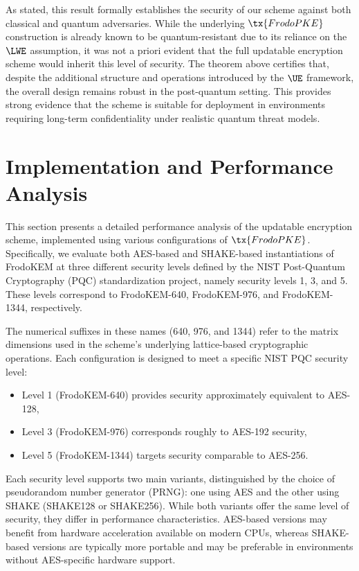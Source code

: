 \documentclass{fundam}
\begin{document}
\noindent As stated, this result formally establishes the security of our scheme against both classical and quantum adversaries. While the underlying $\tx{FrodoPKE}$ construction is already known to be quantum-resistant due to its reliance on the $\LWE$ assumption, it was not a priori evident that the full updatable encryption scheme would inherit this level of security. The theorem above certifies that, despite the additional structure and operations introduced by the $\UE$ framework, the overall design remains robust in the post-quantum setting. This provides strong evidence that the scheme is suitable for deployment in environments requiring long-term confidentiality under realistic quantum threat models.



\section{Implementation and Performance Analysis}

This section presents a detailed performance analysis of the updatable encryption scheme, implemented using various configurations of $\tx{FrodoPKE}$. Specifically, we evaluate both AES-based and SHAKE-based instantiations of FrodoKEM at three different security levels defined by the {NIST Post-Quantum Cryptography (PQC) standardization project}, namely {security levels 1, 3, and 5}. These levels correspond to FrodoKEM-640, FrodoKEM-976, and FrodoKEM-1344, respectively.

The numerical suffixes in these names (640, 976, and 1344) refer to the matrix dimensions used in the scheme’s underlying lattice-based cryptographic operations. Each configuration is designed to meet a specific NIST PQC security level:
\begin{itemize}
	\item Level 1 (FrodoKEM-640) provides security approximately equivalent to AES-128,
	\item Level 3 (FrodoKEM-976) corresponds roughly to AES-192 security,
	\item Level 5 (FrodoKEM-1344) targets security comparable to AES-256.
\end{itemize}
%
Each security level supports two main variants, distinguished by the choice of pseudorandom number generator (PRNG): one using AES and the other using SHAKE (SHAKE128 or SHAKE256). While both variants offer the same level of security, they differ in performance characteristics. AES-based versions may benefit from hardware acceleration available on modern CPUs, whereas SHAKE-based versions are typically more portable and may be preferable in environments without AES-specific hardware support.
\end{document}
